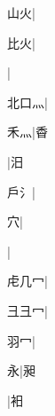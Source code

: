 \begin{multicols}{2}
{{\cjk{}{\cnsym{}　}山火}\mktsJzrVerticalBar{}{\cjk{}{\cnsym{}　}{\cnsym{}　}{\cnsym{}　}}|{}\par
{比火}\mktsJzrVerticalBar{}{\cjk{}{\cnsym{}　}{\cnsym{}　}{\cnsym{}　}}|{}\par
{}|{}\par
{\cjk{}北口{灬}}|{}\par
{\cjk{}{\cnsym{}　}禾{灬}}\mktsJzrVerticalBar{}{\cjk{}{\cnsym{}　}{\cnsym{}　}{\cnsym{}　}}|{\cjk{}稥}\par
{}\mktsJzrVerticalBar{}{\cjk{}{\cnsym{}　}{\cnsym{}　}{\cnsym{}　}}|{\cjk{}汨}\par
{\cjk{}{\cnsym{}　}戶{\cnxHanaA{}氵}}\mktsJzrVerticalBar{}{\cjk{}{\cnsym{}　}{\cnsym{}　}{\cnsym{}　}}|{}\par
{\cjk{}{\cnsym{}　}{\cnsym{}　}穴}\mktsJzrVerticalBar{}{\cjk{}{\cnsym{}　}{\cnsym{}　}{\cnsym{}　}}|{}\par
{}\mktsJzrVerticalBar{}{\cjk{}{\cnsym{}　}{\cnsym{}　}{\cnsym{}　}}|{}\par
{\cjk{}虍几{\cnxHanaA{}冖}}\mktsJzrVerticalBar{}{\cjk{}{\cnsym{}　}{\cnsym{}　}{\cnsym{}　}}|{}\par
{\cjk{}彐彐{\cnxHanaA{}冖}}\mktsJzrVerticalBar{}{\cjk{}{\cnsym{}　}{\cnsym{}　}{\cnsym{}　}}|{}\par
{\cjk{}{\cnsym{}　}羽{\cnxHanaA{}冖}}\mktsJzrVerticalBar{}{\cjk{}{\cnsym{}　}{\cnsym{}　}{\cnsym{}　}}|{}\par
{\cjk{}{\cnsym{}　}{\cnsym{}　}永}\mktsJzrVerticalBar{}{\cjk{}{\cnsym{}　}{\cnsym{}　}{\cnsym{}　}}|{\cjk{}昶}\par
{}\mktsJzrVerticalBar{}{\cjk{}{\cnsym{}　}{\cnsym{}　}{\cnsym{}　}}|{\cjk{}衵}\par
}
\end{multicols}
